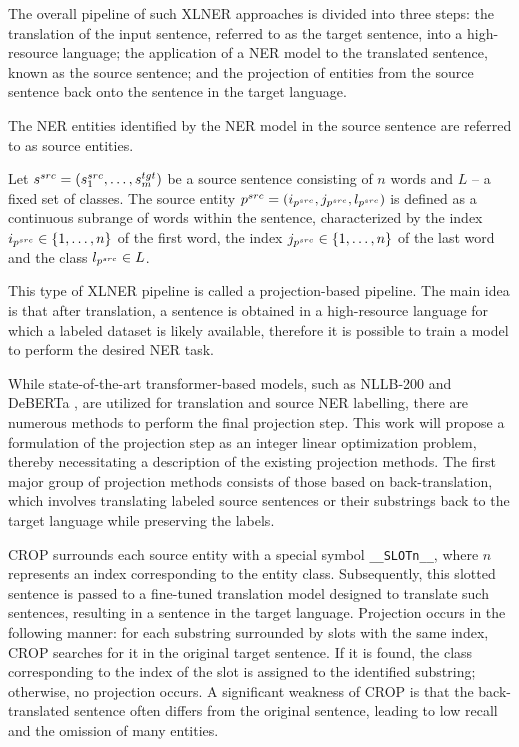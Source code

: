 The overall pipeline of such XLNER approaches is divided into
three steps: the translation of the input sentence, referred to as the target sentence, into a
high-resource language; the application of a NER model to the translated
sentence, known as the source sentence; and the projection of entities from the source sentence
back onto the sentence in the target language.

The NER entities identified by the NER model in the source sentence are referred to as source entities.
\begin{definition}
  Let \( s^{src} = \left( s_1^{src}, \dots, s_m^{tgt} \right) \) be a source sentence consisting of \( n \) words
  and \( L \) -- a fixed set of classes.
  The source entity \( p^{src} = (i_{p^{src}}, j_{p^{src}}, l_{p^{src}} ) \) is defined as a continuous
  subrange of words within the sentence, characterized by the index \( i_{p^{src}} \in \{ 1, \dots, n \} \) of the first
  word, the index \( j_{p^{src}} \in \{ 1, \dots, n \} \) of the last word and the class \( l_{p^{src}} \in L \).
\end{definition}

This type of XLNER pipeline is called a projection-based pipeline. The main idea is that after
translation, a sentence is obtained in a high-resource language for which a labeled dataset is
likely available, therefore it is possible to train a model to perform the desired NER task.

While state-of-the-art transformer-based models, such as NLLB-200 \cite{nllbteam2022languageleftbehindscaling}
and DeBERTa \cite{He2020DeBERTaDB,He2021DeBERTaV3ID}, are utilized for translation and source NER labelling,
there are numerous methods to perform the final projection step. This work will propose a formulation
of the projection step as an integer linear optimization problem, thereby necessitating a description
of the existing projection methods. The first major group of projection methods consists of those based
on back-translation, which involves translating labeled source sentences or their substrings back to the
target language while preserving the labels.

CROP \cite{yang-etal-2022-crop} surrounds each source entity with a special symbol \texttt{\_\_SLOT{n}\_\_},
where \( n \) represents an index corresponding to the entity class. Subsequently, this slotted sentence
is passed to a fine-tuned translation model designed to translate such sentences, resulting in a
sentence in the target language. Projection occurs in the following manner: for each substring
surrounded by slots with the same index, CROP searches for it in the original target sentence. If it
is found, the class corresponding to the index of the slot is assigned to the identified substring;
otherwise, no projection occurs. A significant weakness of CROP is that the back-translated sentence
often differs from the original sentence, leading to low recall and the omission of many entities.

